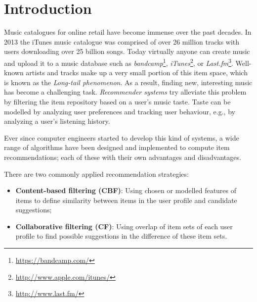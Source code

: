\chapter{Introduction}\label{chapter:introduction}



Music catalogues for online retail have become immense over the past decades. In 2013 the iTunes music catalogue was comprised of over 26 million tracks with users downloading over 25 billion songs\cite{itunes:2013:sales}. Today virtually anyone can create music and upload it to a music database such as \emph{bandcamp}\footnote{\url{https://bandcamp.com/}}, \emph{iTunes}\footnote{\url{http://www.apple.com/itunes/}}, or \emph{Last.fm}\footnote{\url{http://www.last.fm/}}\cite{bandcamp:2013:artists, itunes:2013:sales, lastfm:2012:home}. Well-known artists and tracks make up a very small portion of this item space, which is known as the \emph{Long-tail phenomenon}\cite{levy:2010}. As a result, finding new, interesting music has become a challenging task. \emph{Recommender systems} try alleviate this problem by filtering the item repository based on a user's music taste. Taste can be modelled by analyzing user preferences and tracking user behaviour, e.g., by analyzing a user's listening history\cite{song:2012}.

Ever since computer engineers started to develop this kind of systems, a wide range of algorithms have been designed and implemented to compute item recommendations\cite{burke:2002, melville:2002:CCF:777092.777124, pazzani:2007:CRS:1768197.1768209, rajaraman:2012}; each of these with their own advantages and disadvantages.

There are two commonly applied recommendation strategies\cite{rajaraman:2012}:

\begin{itemize}
	\item \textbf{Content-based filtering (CBF)}: Using chosen or modelled features of items to define similarity between items in the user profile and candidate suggestions;
	\item \textbf{Collaborative filtering (CF)}: Using overlap of item sets of each user profile to find possible suggestions in the difference of these item sets.
\end{itemize}

